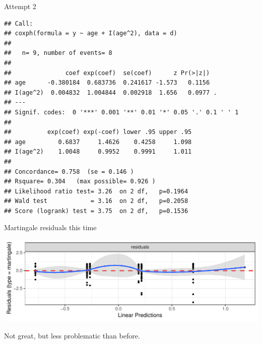 \begin{frame}[fragile]{Attempt 2}
  
  \begin{footnotesize}
\begin{knitrout}
\color{fgcolor}\begin{kframe}
\begin{alltt}
\hlkwb{=}\hlopt{~}\hlopt{+}\hlopt{^}\hlstd{),}
\end{alltt}
\begin{verbatim}
## Call:
## coxph(formula = y ~ age + I(age^2), data = d)
## 
##   n= 9, number of events= 8 
## 
##               coef exp(coef)  se(coef)      z Pr(>|z|)  
## age      -0.380184  0.683736  0.241617 -1.573   0.1156  
## I(age^2)  0.004832  1.004844  0.002918  1.656   0.0977 .
## ---
## Signif. codes:  0 '***' 0.001 '**' 0.01 '*' 0.05 '.' 0.1 ' ' 1
## 
##          exp(coef) exp(-coef) lower .95 upper .95
## age         0.6837     1.4626    0.4258     1.098
## I(age^2)    1.0048     0.9952    0.9991     1.011
## 
## Concordance= 0.758  (se = 0.146 )
## Rsquare= 0.304   (max possible= 0.926 )
## Likelihood ratio test= 3.26  on 2 df,   p=0.1964
## Wald test            = 3.16  on 2 df,   p=0.2058
## Score (logrank) test = 3.75  on 2 df,   p=0.1536
\end{verbatim}
\end{kframe}
\end{knitrout}
  \end{footnotesize}
  
\end{frame}

\begin{frame}[fragile]{Martingale residuals this time}
  
\begin{knitrout}
\color{fgcolor}\begin{kframe}
\begin{alltt}
\hlopt{+}\hlstd{(}
\end{alltt}


{\ttfamily\noindent\itshape\color{messagecolor}{\#\# `geom\_smooth()` using method = 'loess'}}\end{kframe}
\includegraphics[width=\maxwidth]{figure/unnamed-chunk-28-1} 

\end{knitrout}

Not great, but less problematic than before.
  
\end{frame}

